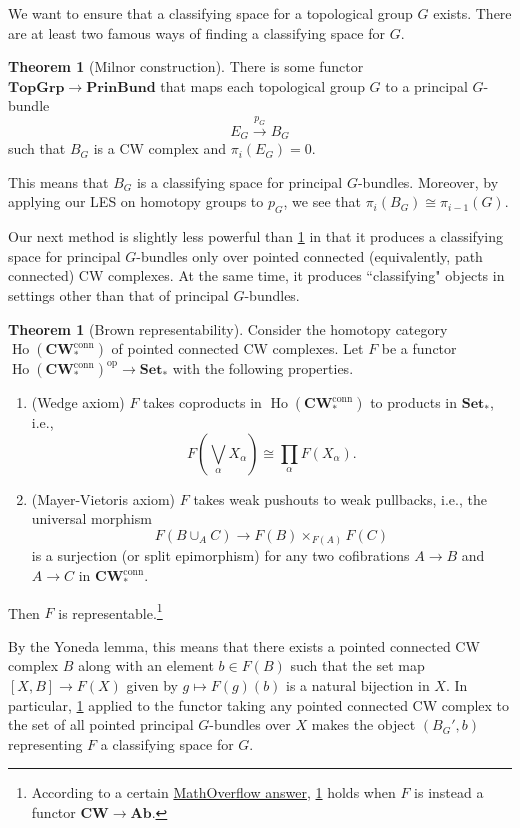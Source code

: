 \documentclass[10pt,letterpaper,cm]{nupset}
\theoremstyle{definition}
\theoremstyle{theorem}
\newtheorem{theorem}[defn]{Theorem}
\theoremstyle{remark}
\newcommand{\1}{\mathbb{1}}
\newcommand{\0}{\vec 0}
\DeclareMathOperator{\ho}{Ho}
\DeclareMathOperator{\op}{op}
\newcommand{\be}{\begin{enumerate}}
\newcommand{\ee}{\end{enumerate}}
\begin{document}
\medskip

We want to ensure that a classifying space for a topological group $G$ exists. There are at least two famous ways of finding a classifying space for $G$.

\begin{theorem}[Milnor construction]\label{MC}
There is some functor $\mathbf{TopGrp} \to \mathbf{PrinBund}$ that maps each topological group $G$ to a principal $G$-bundle $$E_G \overset{p_G}{\longrightarrow} B_G$$ such that $B_G$ is a CW complex and $\pi_i\left(E_G\right) =0$.
\end{theorem}

This means that $B_G$ is a classifying space for principal $G$-bundles.
Moreover, by applying our LES on homotopy groups to $p_G$, we see that  $\pi_i\left(B_G\right) \cong \pi_{i-1}\left(G\right)$.

\medskip

Our next method is slightly less powerful than \cref{MC} in that  it produces a classifying space for principal $G$-bundles only over pointed connected (equivalently, path connected) CW complexes. At the same time, it produces ``classifying" objects in settings other than that of principal $G$-bundles.

\begin{theorem}[Brown representability]\label{BR} Consider the homotopy category $\ho(\mathbf{CW}_{\ast}^{\text{conn}})$  of pointed connected CW complexes. Let $F$ be a functor $\ho(\mathbf{CW}_{\ast}^{\text{conn}})^{\op} \to \mathbf{Set}_{\ast}$ with the following properties. 
\be[label=(\roman*)]
\item (Wedge axiom) $F$ takes coproducts in $\ho(\mathbf{CW}_{\ast}^{\text{conn}})$ to products in $\mathbf{Set}_{\ast}$, i.e., 
\[
F\left(\bigvee_{\alpha}X_{\alpha}\right) \cong \prod_{\alpha}F(X_{\alpha}).
\]
\item (Mayer-Vietoris axiom) $F$ takes weak pushouts to weak pullbacks, i.e., the universal morphism
\[
F(B\cup_A C) \to F(B)\times_{F(A)} F(C)
\] is a surjection (or split epimorphism) for any two cofibrations $A \to B$ and $A \to C$ in $\mathbf{CW}_{\ast}^{\text{conn}}$.
\ee
Then $F$ is representable.\footnote{According to a certain \href{https://mathoverflow.net/q/11523}{MathOverflow answer}, \cref{BR} holds when $F$ is instead a functor $\mathbf{CW} \to \mathbf{Ab}$.}

\end{theorem}

By the Yoneda lemma, this means that there exists a pointed  connected CW complex $B$ along with an element $b\in F(B)$ such that the set map $\left[X, B\right] \to F(X)$ given by $g\mapsto F(g)(b)$ is a natural bijection in $X$. In particular, \cref{BR} applied to the functor taking any pointed connected CW complex to the set of all pointed principal $G$-bundles over $X$ makes the  object $\left(B_G', b\right)$ representing $F$ a classifying space for $G$.
\end{document}
